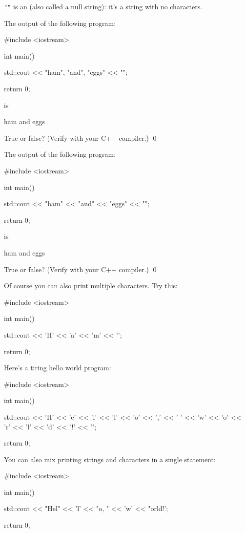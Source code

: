 \verb!""! 
is an 
(also called a null string): 
it's a string with no characters.

\begin{ex}
The output of the following program:
\begin{console}
#include <iostream>

int main()
{
    std::cout << "ham", "and", "eggs"
              << "\n";
      
    return 0;
}
\end{console}
is
\begin{console}
ham and eggs
\end{console}
True or false? (Verify with your C++ compiler.)
\qed
\end{ex}


\begin{ex}
The output of the following program:
\begin{console}
#include <iostream>

int main()
{
    std::cout << "ham" << "and" << "eggs"
              << "\n";
      
    return 0;
}
\end{console}
is
\begin{console}
ham and eggs
\end{console}
True or false? (Verify with your C++ compiler.)
\qed
\end{ex}


Of course you can also print multiple characters. Try this:
\begin{console}
#include <iostream>

int main()
{
    std::cout << 'H' << 'a' << 'm' << '\n';
         
    return 0;
}
\end{console}

Here's a tiring hello world program:
\begin{console}
#include <iostream>

int main()
{
    std::cout << 'H' << 'e' << 'l' << 'l' << 'o'
              << ',' << ' ' 
              << 'w' << 'o' << 'r' << 'l' << 'd' 
              << '!' 
              << '\n';
         
    return 0;
}
\end{console}

You can also mix printing strings and characters in a single statement:
\begin{console}
#include <iostream>

int main()
{
    std::cout << "Hel" << 'l' << "o, " 
              << 'w' << "orld!\n';
         
    return 0;
}
\end{console}







